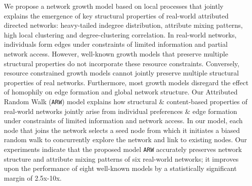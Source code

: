 
We propose a network growth model based on local processes that jointly explains the
emergence of key structural properties of real-world attributed directed networks:
heavy-tailed indegree distribution, attribute mixing patterns, high local
clustering and degree-clustering correlation.
In real-world networks, individuals form edges
under constraints of limited information and partial network access. However,
well-known growth models that preserve multiple structural properties do not
incorporate these resource constraints. Conversely, resource constrained growth models
cannot jointly preserve multiple structural
properties of real networks. Furthermore, most growth models disregard
the effect of homophily on edge formation and global network structure.
Our Attributed Random Walk (\texttt{ARW}) model explains how structural \&
content-based properties of real-world networks jointly arise from individual
preferences \& edge formation under constraints of limited information and network access.
In our model, each node that joins the network selects a seed node from which it initiates a
biased random walk to concurrently explore the network and link to existing nodes.
Our experiments indicate that the proposed model \texttt{ARW} accurately preserves network structure
and attribute mixing patterns of six real-world networks; it improves upon
the performance of eight well-known models by a statistically significant margin of 2.5x-10x.
%
%
